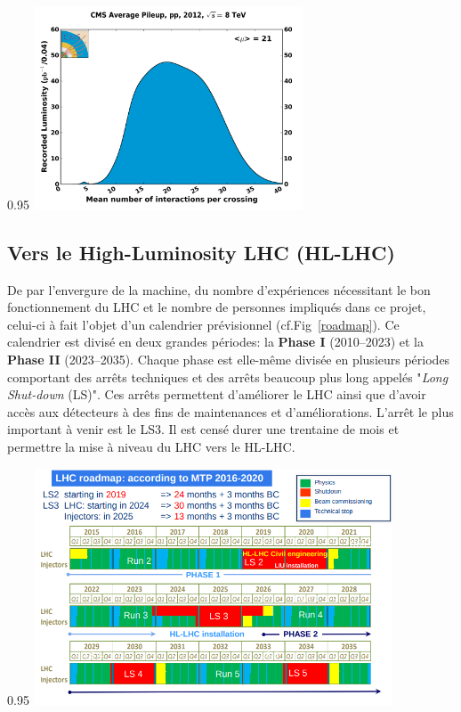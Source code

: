 \begin{minipagewithmarginpars}[ht!]{0.95\textwidth}
	\centering
	\includegraphics[width=0.60\textwidth]{LHC/pileup.png}
	\label{pile-up}	
\end{minipagewithmarginpars}

\subsection{Vers le High-Luminosity LHC (HL-LHC)}
De par l'envergure de la machine, du nombre d'expériences nécessitant le bon fonctionnement du LHC et le nombre de personnes impliqués dans ce projet, celui-ci à fait l'objet d'un calendrier prévisionnel (cf.Fig~\ref{roadmap}). Ce calendrier est divisé en deux grandes périodes: la \textbf{Phase I} (\num{2010}--\num{2023}) et la  \textbf{Phase II} (\num{2023}--\num{2035}). Chaque phase est elle-même divisée en plusieurs périodes comportant des arrêts techniques et des arrêts beaucoup plus long appelés "\textit{Long Shut-down} (LS)". Ces arrêts permettent d'améliorer le LHC ainsi que d'avoir accès aux détecteurs à des fins de maintenances et d'améliorations. L'arrêt le plus important à venir est le LS3. Il est censé durer une trentaine de mois et permettre la mise à niveau du LHC vers le HL-LHC.

\begin{minipagewithmarginpars}[ht!]{0.95\textwidth}
	\centering
	\includegraphics[width=0.80\textwidth]{LHC/roadmap.png}
	\label{roadmap}	
\end{minipagewithmarginpars}

